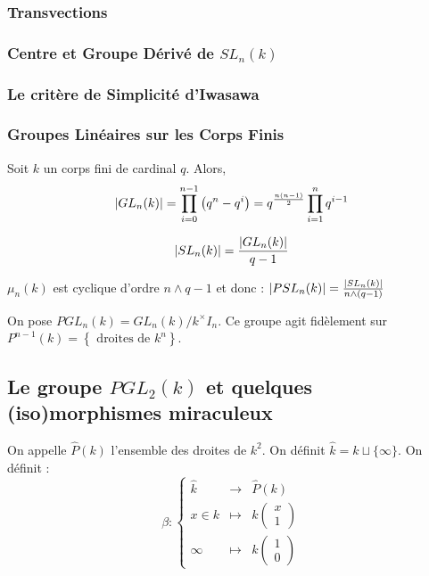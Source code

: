 \documentclass{cours}
\begin{document}
\subsubsection{Transvections}

\subsubsection{Centre et Groupe Dérivé de $SL_{n}(k)$}

\subsubsection{Le critère de Simplicité d'Iwasawa}

\subsubsection{Groupes Linéaires sur les Corps Finis}
\begin{lemma}
    Soit $k$ un corps fini de cardinal $q$. Alors,
    \[
        \left|GL_{n}(k)\right| = \prod_{i = 0}^{n - 1} \left(q^{n} - q^{i}\right) = q^{\frac{n(n-1)}{2}}\prod_{i = 1}^{n}q^{i - 1}
    \]
\end{lemma}
\begin{corollary}
    \[\left|SL_{n}(k)\right| = \frac{\left|GL_{n}(k)\right|}{q - 1}\]
\end{corollary}
\begin{corollary}
    $\mu_{n}(k)$ est cyclique d'ordre $n \wedge q - 1$ et donc : $\left|PSL_{n}(k)\right| = \frac{\left|SL_{n}(k)\right|}{n \wedge (q - 1)}$
\end{corollary}

\begin{definition}
    On pose $PGL_{n}(k) = GL_{n}(k)/k^{\times}I_{n}$. Ce groupe agit fidèlement sur $P^{n - 1}(k) = \left\{\text{ droites de } k^{n}\right\}$.
\end{definition}

\subsection{Le groupe $PGL_{2}(k)$ et quelques (iso)morphismes miraculeux}
\begin{definition}
    On appelle $\hat{P}(k)$ l'ensemble des droites de $k^{2}$. On définit $\hat{k} = k \sqcup \{\infty\}$. On définit :
    \[
        \beta : \left\{\begin{array}{ccc}
            \hat{k} & \longrightarrow & \hat{P}(k)                                   \\
            x \in k & \longmapsto     & k\left(\begin{array}{c} x \\ 1
                                                   \end{array}\right) \\
            \infty  & \longmapsto     & k\left(\begin{array}{c} 1 \\ 0
                                                   \end{array}\right)
        \end{array}\right.
    \]
\end{definition}
\end{document}
